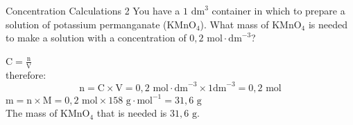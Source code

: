     \noindent
\par


      \begin{wex}{Concentration Calculations 2 }
{
You have a $1 {\text{ dm}}^{3}$ container in which to prepare a solution of potassium permanganate ($\text{KMnO}{}_{4}$). What mass of $\text{KMnO}{}_{4}$ is needed to make a solution with a concentration of $0,2 \text{ mol}\cdot \text{dm}^{-3}$? 
     }
{
$\text{C}=\frac{\text{n}}{\text{V}}$\\
therefore:
      \label{m38712*id283321}\nopagebreak\noindent{}        
    \begin{equation*}
    \text{n}=\text{C}\ensuremath{\times}\text{V}=0,2 \text{ mol} \cdot \text{dm}^{-3} \times 1 \text{dm}^{-3} = 0,2 \text{ mol}
      \end{equation*}
$\text{m}=\text{n} \times \text{M} = 0,2 \text{ mol} \times 158 \text{ g} \cdot \text{mol}^{-1} = 31,6 \text{ g}$\\
The mass of $\text{KMnO}{}_{4}$ that is needed is $31,6 \text{ g}$.
 
}
    \end{wex}
    \noindent
\label{m38712*secfhsst!!!underscore!!!id1795} 

